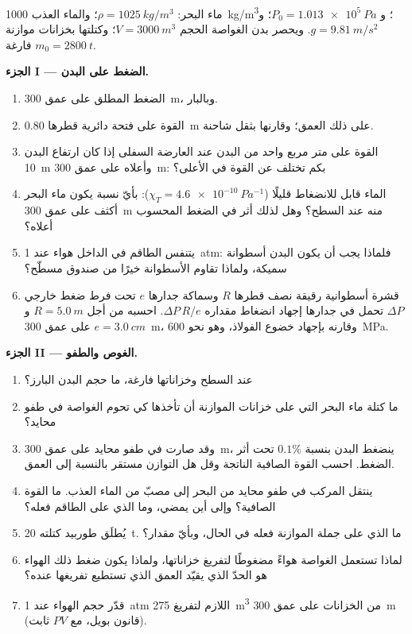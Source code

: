 \begin{problem}
\label{pb:b1:fluid-statics:1}
ماء البحر: $\rho = \qty{1025}{kg/m^3}$؛ والماء العذب \qty{1000}{kg/m^3}؛
و $P_0 = \qty{1.013e5}{Pa}$؛ و $g = \qty{9.81}{m/s^2}$. ويحصر بدن الغواصة
الحجم $V = \qty{3000}{m^3}$؛ وكتلتها بخزانات موازنة فارغة
$m_0 = \qty{2800}{t}$.

\medskip
\noindent\textbf{الجزء I --- الضغط على البدن.}
\begin{enumerate}
  \item الضغط المطلق على عمق \qty{300}{m}،  وبالبار.
  \item القوة على فتحة دائرية قطرها \qty{0.80}{m} على ذلك العمق؛
        وقارنها بثقل شاحنة.
  \item القوة على متر مربع واحد من البدن عند العارضة السفلى إذا
        كان ارتفاع البدن \qty{10}{m} وأعلاه على عمق \qty{300}{m}: بكم
        تختلف عن القوة في الأعلى؟
  \item الماء قابل للانضغاط قليلًا ($\chi_T = \qty{4.6e-10}{Pa^{-1}}$):
        بأيّ نسبة يكون ماء البحر أكثف على عمق \qty{300}{m} منه عند
        السطح؟ وهل لذلك أثر في الضغط المحسوب أعلاه؟
  \item يتنفس الطاقم في الداخل هواء عند \qty{1}{atm}: فلماذا يجب أن
        يكون البدن أسطوانة سميكة، ولماذا تقاوم الأسطوانة خيرًا
        من صندوق مسطّح؟
  \item قشرة أسطوانية رقيقة نصف قطرها $R$ وسماكة جدارها $e$ تحت
        فرط ضغط خارجي $\Delta P$ تحمل في جدارها إجهاد انضغاط
        مقداره $\Delta P\,R/e$. احسبه من أجل $R = \qty{5.0}{m}$ و
        $e = \qty{3.0}{cm}$ على عمق \qty{300}{m}، وقارنه بإجهاد خضوع
        الفولاذ، وهو نحو \qty{600}{MPa}.
\end{enumerate}

\medskip
\noindent\textbf{الجزء II --- الغوص والطفو.}
\begin{enumerate}[resume]
  \item عند السطح وخزاناتها فارغة، ما حجم البدن البارز؟
  \item ما كتلة ماء البحر التي على خزانات الموازنة أن تأخذها كي
        تحوم الغواصة في طفو محايد؟
  \item وقد صارت في طفو محايد على عمق \qty{300}{m}، ينضغط البدن
        بنسبة $0.1\%$ تحت أثر الضغط. احسب القوة الصافية الناتجة
        وقل هل التوازن مستقر بالنسبة إلى العمق.
  \item ينتقل المركب في طفو محايد من البحر إلى مصبّ من الماء
        العذب. ما القوة الصافية؟ وإلى أين يمضي، وما الذي على
        الطاقم فعله؟
  \item يُطلَق طوربيد كتلته \qty{20}{t}. ما الذي على جملة الموازنة
        فعله في الحال، وبأيّ مقدار؟
  \item لماذا تستعمل الغواصة هواءً مضغوطًا لتفريغ خزاناتها،
        ولماذا يكون ضغط ذلك الهواء هو الحدّ الذي يقيّد العمق الذي
        تستطيع تفريغها عنده؟
  \item قدّر حجم الهواء عند \qty{1}{atm} اللازم لتفريغ
        \qty{275}{m^3} من الخزانات على عمق \qty{300}{m} (قانون بويل،
        مع $PV$ ثابت).
\end{enumerate}


\end{problem}
